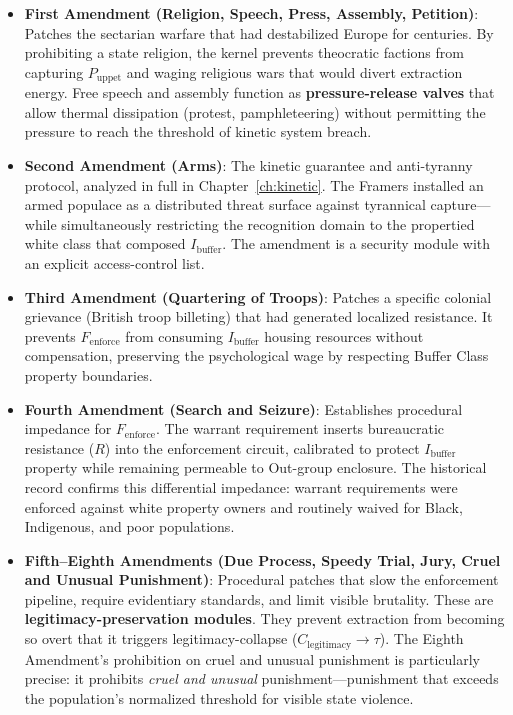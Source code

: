 \begin{itemize}
    \item \textbf{First Amendment (Religion, Speech, Press, Assembly, Petition)}: Patches the sectarian warfare that had destabilized Europe for centuries. By prohibiting a state religion, the kernel prevents theocratic factions from capturing $P_{\text{uppet}}$ and waging religious wars that would divert extraction energy. Free speech and assembly function as \textbf{pressure-release valves} that allow thermal dissipation (protest, pamphleteering) without permitting the pressure to reach the threshold of kinetic system breach.
    
    \item \textbf{Second Amendment (Arms)}: The kinetic guarantee and anti-tyranny protocol, analyzed in full in Chapter~\ref{ch:kinetic}. The Framers installed an armed populace as a distributed threat surface against tyrannical capture---while simultaneously restricting the recognition domain to the propertied white class that composed $I_{\text{buffer}}$. The amendment is a security module with an explicit access-control list.
    
    \item \textbf{Third Amendment (Quartering of Troops)}: Patches a specific colonial grievance (British troop billeting) that had generated localized resistance. It prevents $F_{\text{enforce}}$ from consuming $I_{\text{buffer}}$ housing resources without compensation, preserving the psychological wage by respecting Buffer Class property boundaries.
    
    \item \textbf{Fourth Amendment (Search and Seizure)}: Establishes procedural impedance for $F_{\text{enforce}}$. The warrant requirement inserts bureaucratic resistance ($R$) into the enforcement circuit, calibrated to protect $I_{\text{buffer}}$ property while remaining permeable to Out-group enclosure. The historical record confirms this differential impedance: warrant requirements were enforced against white property owners and routinely waived for Black, Indigenous, and poor populations.
    
    \item \textbf{Fifth--Eighth Amendments (Due Process, Speedy Trial, Jury, Cruel and Unusual Punishment)}: Procedural patches that slow the enforcement pipeline, require evidentiary standards, and limit visible brutality. These are \textbf{legitimacy-preservation modules}. They prevent extraction from becoming so overt that it triggers legitimacy-collapse ($C_{\text{legitimacy}} \rightarrow \tau$). The Eighth Amendment's prohibition on cruel and unusual punishment is particularly precise: it prohibits \textit{cruel and unusual} punishment---punishment that exceeds the population's normalized threshold for visible state violence.
    

\end{itemize}
